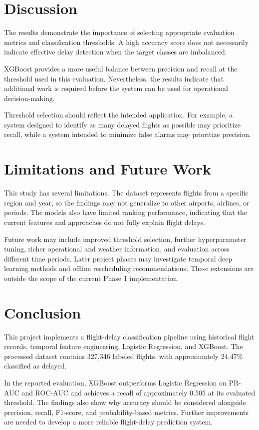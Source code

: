 \documentclass[conference]{IEEEtran}
\begin{document}
\section{Discussion}

The results demonstrate the importance of selecting appropriate
evaluation metrics and classification thresholds. A high accuracy
score does not necessarily indicate effective delay detection when
the target classes are imbalanced.

XGBoost provides a more useful balance between precision and recall
at the threshold used in this evaluation. Nevertheless, the results
indicate that additional work is required before the system can be
used for operational decision-making.

Threshold selection should reflect the intended application. For
example, a system designed to identify as many delayed flights as
possible may prioritize recall, while a system intended to minimize
false alarms may prioritize precision.

\section{Limitations and Future Work}

This study has several limitations. The dataset represents flights
from a specific region and year, so the findings may not generalize
to other airports, airlines, or periods. The models also have limited
ranking performance, indicating that the current features and
approaches do not fully explain flight delays.

Future work may include improved threshold selection, further
hyperparameter tuning, richer operational and weather information,
and evaluation across different time periods. Later project phases
may investigate temporal deep learning methods and offline
rescheduling recommendations. These extensions are outside the
scope of the current Phase 1 implementation.

\section{Conclusion}

This project implements a flight-delay classification pipeline using
historical flight records, temporal feature engineering, Logistic
Regression, and XGBoost. The processed dataset contains 327,346
labeled flights, with approximately 24.47\% classified as delayed.

In the reported evaluation, XGBoost outperforms Logistic Regression
on PR-AUC and ROC-AUC and achieves a recall of approximately 0.505
at its evaluated threshold. The findings also show why accuracy
should be considered alongside precision, recall, F1-score, and
probability-based metrics. Further improvements are needed to
develop a more reliable flight-delay prediction system.
\end{document}
